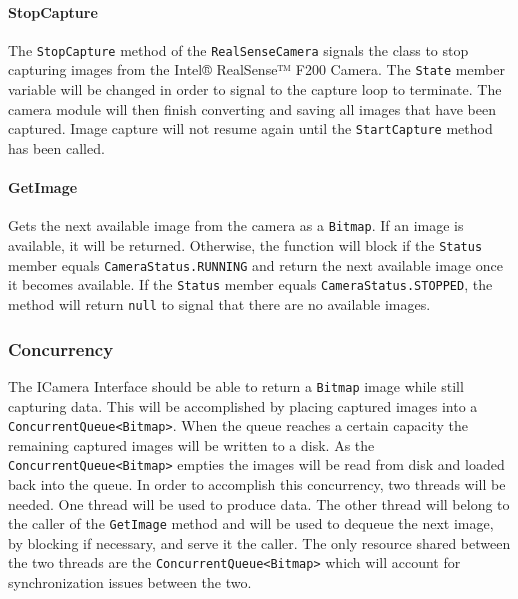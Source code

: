 \documentclass[12pt]{article}
\begin{document}
\paragraph{StopCapture}\label{stopcapture}

The \texttt{StopCapture} method of the \texttt{RealSenseCamera} signals
the class to stop capturing images from the Intel® RealSense™ F200
Camera. The \texttt{State} member variable will be changed in order to
signal to the capture loop to terminate. The camera module will then
finish converting and saving all images that have been captured. Image
capture will not resume again until the \texttt{StartCapture} method has
been called.

\paragraph{GetImage}\label{getimage}

Gets the next available image from the camera as a \texttt{Bitmap}. If
an image is available, it will be returned. Otherwise, the function will
block if the \texttt{Status} member equals \texttt{CameraStatus.RUNNING}
and return the next available image once it becomes available. If the
\texttt{Status} member equals \texttt{CameraStatus.STOPPED}, the method
will return \texttt{null} to signal that there are no available images.

\subsubsection{Concurrency}\label{concurrency}

The ICamera Interface should be able to return a \texttt{Bitmap} image
while still capturing data. This will be accomplished by placing
captured images into a
\texttt{ConcurrentQueue\textless{}Bitmap\textgreater{}}. When the queue
reaches a certain capacity the remaining captured images will be written
to a disk. As the
\texttt{ConcurrentQueue\textless{}Bitmap\textgreater{}} empties the
images will be read from disk and loaded back into the queue. In order
to accomplish this concurrency, two threads will be needed. One thread
will be used to produce data. The other thread will belong to the caller
of the \texttt{GetImage} method and will be used to dequeue the next
image, by blocking if necessary, and serve it the caller. The only
resource shared between the two threads are the
\texttt{ConcurrentQueue\textless{}Bitmap\textgreater{}} which will
account for synchronization issues between the two.
\end{document}
